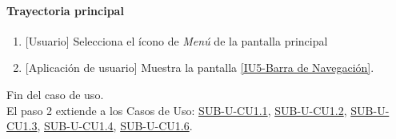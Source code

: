 \paragraph{Trayectoria principal}
	\begin{enumerate}
		\item {[Usuario]} Selecciona el ícono de \textit{Menú} de la pantalla principal %
		\item {[Aplicación de usuario]} Muestra la pantalla \hyperref[fig:Barra de navegacion]{[IU5-Barra de Navegación]}.
	\end{enumerate}
	Fin del caso de uso.\\
	El paso 2 extiende a los Casos de Uso: \hyperref[SUB-U-CU1.1]{SUB-U-CU1.1}, \hyperref[SUB-U-CU1.2]{SUB-U-CU1.2}, \hyperref[SUB-U-CU1.3]{SUB-U-CU1.3}, \hyperref[SUB-U-CU1.4]{SUB-U-CU1.4},
	\hyperref[SUB-U-CU1.6]{SUB-U-CU1.6}.
	
	

